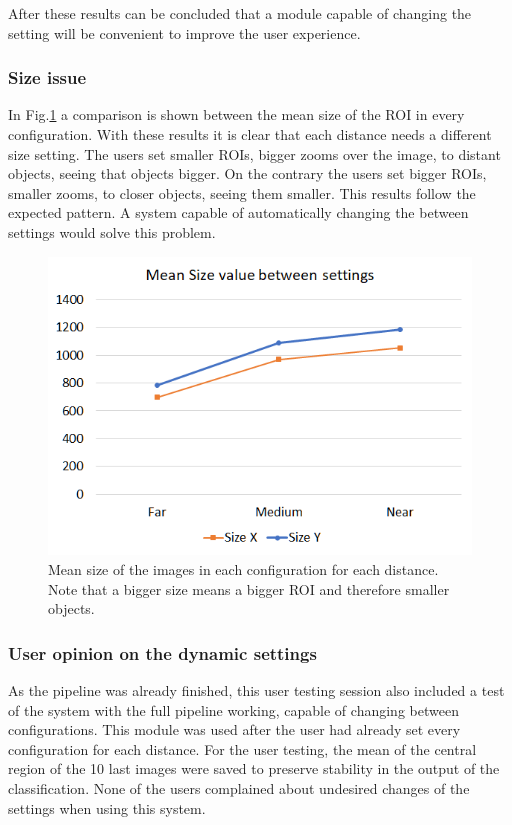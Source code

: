 \documentclass[10pt,a4paper,twocolumn,twoside]{article}
\begin{document}
	After these results can be concluded that a module capable of changing the setting will be convenient to improve the user experience. 
	

	
	\subsubsection{Size issue}
	
	In Fig.\ref{fig:ut:2:size} a comparison is shown between the mean size of the ROI in every configuration. With these results it is clear that each distance needs a different size setting.  The users set smaller ROIs, bigger zooms over the image, to distant objects, seeing that objects bigger. On the contrary the users set bigger ROIs, smaller zooms, to closer objects, seeing them smaller. This results follow the expected pattern. A system capable of automatically changing the between settings would solve this problem. 
	
	\begin{figure}[h]
		\centering
		\includegraphics[width=1\linewidth]{img/userTestingSizechart.png}
		\caption{Mean size of the images in each configuration for each distance. Note that a bigger size means a bigger ROI and therefore smaller objects.}
		\label{fig:ut:2:size}
	\end{figure}
	
	\subsubsection{User opinion on the dynamic settings}
	As the pipeline was already finished, this user testing session also included a test of the system with the full pipeline working, capable of changing between configurations. This module was used after the user had already set every configuration for each distance.  
	For the user testing, the mean of the central region of the 10 last images were saved to preserve stability in the output of the classification. None of the users complained about undesired changes of the settings when using this system.  
	
\end{document}
